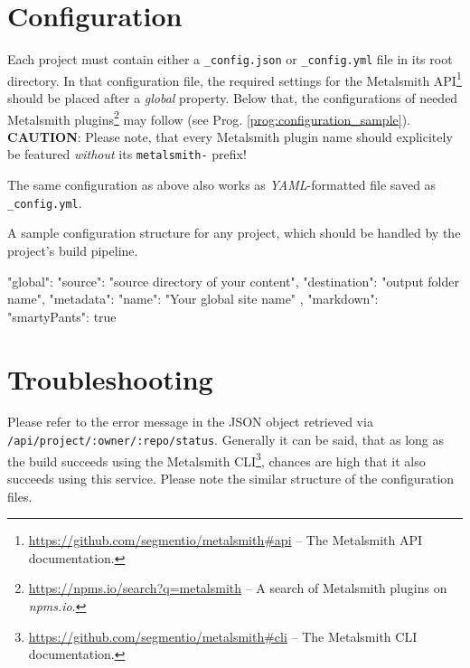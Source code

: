 \documentclass[a4paper,english,11pt]{report}
\begin{document}
\chapter{Configuration}
Each project must contain either a \texttt{\_config.json} or \texttt{\_config.yml} file in its root directory. In that configuration file, the required settings for the Metalsmith API\footnote{\url{https://github.com/segmentio/metalsmith\#api} -- The Metalsmith API documentation.} should be placed after a \emph{global} property.
Below that, the configurations of needed Metalsmith plugins\footnote{\url{https://npms.io/search?q=metalsmith} -- A search of Metalsmith plugins on \emph{npms.io}.} may follow (see Prog. \ref{prog:configuration_sample}).\\
\textbf{CAUTION}: Please note, that every Metalsmith plugin name should explicitely be featured \emph{without} its \texttt{metalsmith-} prefix!

The same configuration as above also works as \emph{YAML}-formatted file saved as \texttt{\_config.yml}.

\begin{program}[t]
  \caption{A sample configuration structure for any project, which should be handled by the project's build pipeline.}
  \label{prog:configuration_sample}
  \begin{JsCode}
    {
      "global": {
        "source": "{source directory of your content}",
        "destination": "{output folder name}",
        "metadata": {
          "name": "Your global site name"
        }
      },
      "markdown": {
        "smartyPants": true
      }
    }
  \end{JsCode}
\end{program}

\chapter{Troubleshooting}
Please refer to the error message in the JSON object retrieved via\\
\texttt{/api/project/:owner/:repo/status}.
Generally it can be said, that as long as the build succeeds using the Metalsmith CLI\footnote{\url{https://github.com/segmentio/metalsmith\#cli} -- The Metalsmith CLI documentation.}, chances are high that it also succeeds using this service. Please note the similar structure of the configuration files.

\end{document}
